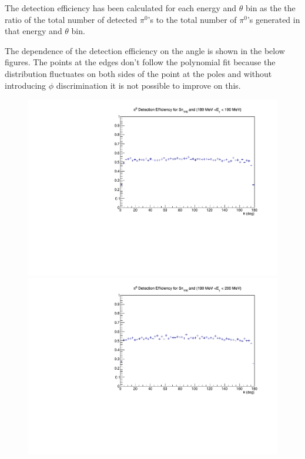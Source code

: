\indent The detection efficiency has been calculated for each energy and $\theta$ bin as the the ratio of the total number of detected $\pi^{0}$'s to the total number of $\pi^{0}$'s generated in that energy and $\theta$ bin.

\indent The dependence of the detection efficiency on the angle is shown in the below figures. The points at the edges don't follow the polynomial fit because the distribution fluctuates on both sides of the point at the poles and without introducing $\phi$ discrimination it is not possible to improve on this.

\begin{figure}[H]
\begin{center}
\includegraphics[scale=0.4]{pictures/pdf/pi0_efficiency_Sn116_Ebin6.pdf}
\includegraphics[scale=0.4]{pictures/pdf/pi0_efficiency_Sn116_Ebin7.pdf}

\end{center}
\end{figure}
